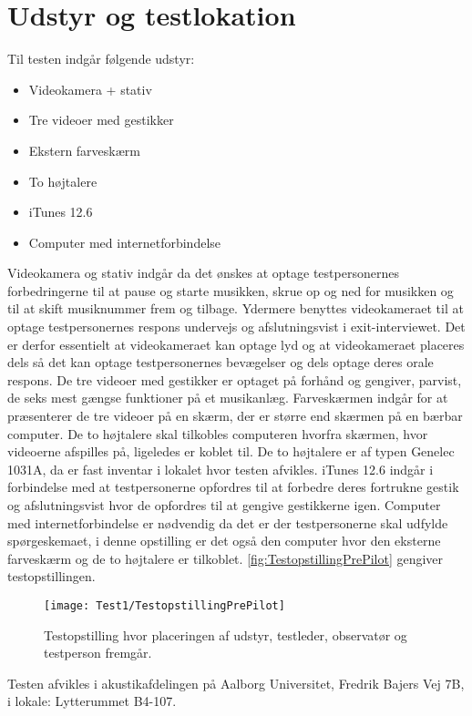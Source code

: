 \section{Udstyr og testlokation}
\label{UdstyrOgTestlokationValgAfGestikker}
%
Til testen indgår følgende udstyr:
%
\begin{itemize}
  \item Videokamera + stativ
  \item Tre videoer med gestikker
  \item Ekstern farveskærm 
  \item To højtalere
  \item iTunes 12.6  
  \item Computer med internetforbindelse\blankline
\end{itemize}
% 
Videokamera og stativ indgår da det ønskes at optage testpersonernes forbedringerne til at pause og starte musikken, skrue op og ned for musikken og til at skift musiknummer frem og tilbage. Ydermere benyttes videokameraet til at optage testpersonernes respons undervejs og afslutningsvist i exit-interviewet. Det er derfor essentielt at videokameraet kan optage lyd og at videokameraet placeres dels så det kan optage testpersonernes bevægelser og dels optage deres orale respons. De tre videoer med gestikker er optaget på forhånd og gengiver, parvist, de seks mest gængse funktioner på et musikanlæg. Farveskærmen indgår for at præsenterer de tre videoer på en skærm, der er større end skærmen på en bærbar computer. De to højtalere skal tilkobles computeren hvorfra skærmen, hvor videoerne afspilles på, ligeledes er koblet til. De to højtalere er af typen Genelec 1031A, da er fast inventar i lokalet hvor testen afvikles. iTunes 12.6 indgår i forbindelse med at testpersonerne opfordres til at forbedre deres fortrukne gestik og afslutningsvist hvor de opfordres til at gengive gestikkerne igen. Computer med internetforbindelse er nødvendig da det er der testpersonerne skal udfylde spørgeskemaet, i denne opstilling er det også den computer hvor den eksterne farveskærm og de to højtalere er tilkoblet. \autoref{fig:TestopstillingPrePilot} gengiver testopstillingen.  
%
\begin{figure}[H]
	\centering
	\texttt{[image: Test1/TestopstillingPrePilot]}
	\caption{Testopstilling hvor placeringen af udstyr, testleder, observatør og testperson fremgår.}
	\label{fig:TestopstillingPrePilot}
\end{figure}
\noindent
% 
Testen afvikles i akustikafdelingen på Aalborg Universitet, Fredrik Bajers Vej 7B, i lokale: Lytterummet B4-107. 
%
